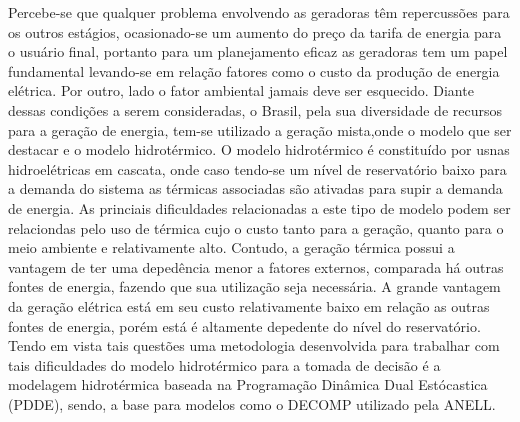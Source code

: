 \newpage
\noindent
Percebe-se que qualquer problema envolvendo as geradoras t\^{e}m repercuss\~{o}es para os outros est\'{a}gios, ocasionado-se um aumento do
pre\c{c}o da tarifa de energia para o usu\'{a}rio final, portanto para um planejamento eficaz as geradoras tem um papel fundamental levando-se
em rela\c{c}\~{a}o fatores como o custo da produ\c{c}\~{a}o de energia el\'{e}trica. Por outro, lado o fator ambiental jamais deve ser esquecido.
Diante dessas condi\c{c}\~{o}es a serem consideradas, o Brasil, pela sua diversidade de recursos para a gera\c{c}\~{a}o de energia, tem-se 
utilizado a gera\c{c}\~{a}o mista,onde o modelo que ser destacar e o modelo hidrot\'{e}rmico. O modelo hidrot\'{e}rmico \'{e} constitu\'{i}do por 
usnas hidroel\'{e}tricas em cascata, onde caso tendo-se um n\'{i}vel de reservat\'{o}rio baixo para a demanda do sistema as t\'{e}rmicas associadas
s\~{a}o ativadas para supir a demanda de energia. As princiais dificuldades relacionadas a este tipo de modelo podem ser relaciondas pelo
uso de t\'{e}rmica cujo o custo tanto para a gera\c{c}\~{a}o, quanto para o meio ambiente e relativamente alto. Contudo, a gera\c{c}\~{a}o
t\'{e}rmica possui a vantagem de ter uma deped\^{e}ncia menor a fatores externos, comparada  h\'{a} outras fontes de energia, fazendo que sua
utiliza\c{c}\~{a}o seja necess\'{a}ria. A grande vantagem da gera\c{c}\~{a}o el\'{e}trica est\'{a} em seu custo relativamente baixo em
rela\c{c}\~{a}o as outras fontes de energia, por\'{e}m est\'{a} \'{e} altamente depedente do n\'{i}vel do reservat\'{o}rio. Tendo em vista tais
quest\~{o}es uma metodologia desenvolvida para trabalhar com tais dificuldades do modelo hidrot\'{e}rmico para a tomada de decis\~{a}o \'{e}
a modelagem hidrot\'{e}rmica baseada na Programa\c{c}\~{a}o Din\^{a}mica
Dual Est\'{o}castica (PDDE), sendo, a base para  modelos como o DECOMP utilizado pela ANELL.




